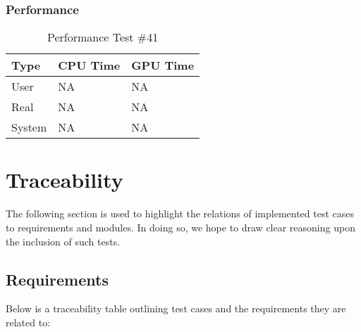\documentclass[12pt]{article}
\begin{document}
	\subsubsection{Performance}
		\begin{table}[!htbp]
		\centering
		\caption{Performance Test \#41}\label{_acc}
		\begin{tabular}{lll}
		\toprule
		Type&CPU Time& GPU Time\\\midrule
		User&NA&NA\\
		Real&NA&NA\\
		System&NA&NA\\
		\end{tabular}
		\end{table}
\section{Traceability}
The following section is used to highlight the relations of implemented test cases to requirements and modules. In doing so, we hope to draw clear reasoning upon the inclusion of such tests. 
\subsection{Requirements}
Below is a traceability table outlining test cases and the requirements they are related to:\\
\end{document}
